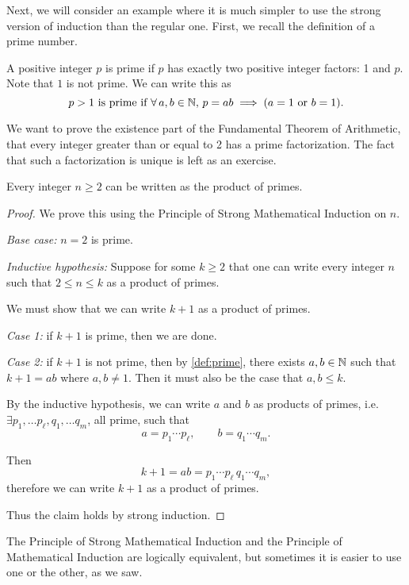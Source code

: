 \documentclass{article}
\begin{document}
Next, we will consider an example where it is much simpler to use the strong version of induction than the regular one. First, we recall the definition of a prime number.

\begin{definition}
\label{def:prime}
A positive integer $p$ is prime if $p$ has exactly two positive integer factors: 1 and $p$. Note that $1$ is not prime. We can write this as 
$$ p > 1 \text{ is prime if } \forall \, a, b \in {\mathbb{N}}, \, p=ab \implies (a = 1 \text{ or } b =1).$$
\end{definition}

We want to prove the existence part of the Fundamental Theorem of Arithmetic, that every integer greater than or equal to 2 has a prime factorization. The fact that such a factorization is unique is left as an exercise.

\begin{example}
Every integer $n \geq 2$ can be written as the product of primes.
\end{example}

\begin{proof}
We prove this using the Principle of Strong Mathematical Induction on $n$.

{\it Base case:} $n = 2$ is prime. 

{\it Inductive hypothesis:} Suppose for some $k \geq 2$ that one can write every integer $n$ such that $2 \leq n \leq k$ as a product of primes.

We must show that we can write $k+1$ as a product of primes.

{\it Case 1:} if $k+1$ is prime, then we are done. 

{\it Case 2:} if $k+1$ is not prime, then by \cref{def:prime}, there exists $a,b \in {\mathbb{N}}$ such that $k+1 = ab$ where $a,b \neq 1$. Then it must also be the case that $a,b \leq k$.

By the inductive hypothesis, we can write $a$ and $b$ as products of primes, i.e. $\exists p_1, \ldots p_\ell, q_1, \ldots q_m$, all prime, such that 
$$ a = p_1 \cdots p_\ell, \qquad b = q_1 \cdots q_m.$$

Then 
$$ k+1 = ab =  p_1 \cdots p_\ell \, q_1 \cdots q_m, $$
therefore we can write $k+1$ as a product of primes.

Thus the claim holds by strong induction.
\end{proof}


The Principle of Strong Mathematical Induction and the Principle of Mathematical Induction are logically equivalent, but sometimes it is easier to use one or the other, as we saw.
\end{document}
